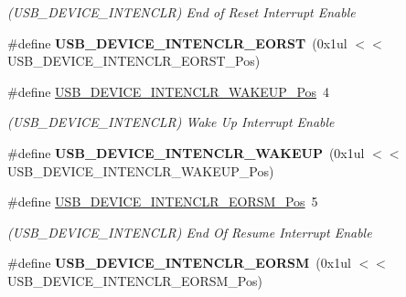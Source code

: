 \begin{DoxyCompactItemize}
\begin{DoxyCompactList}\small\item\em (U\+S\+B\+\_\+\+D\+E\+V\+I\+C\+E\+\_\+\+I\+N\+T\+E\+N\+C\+L\+R) End of Reset Interrupt Enable \end{DoxyCompactList}\item 
\hypertarget{group___s_a_m_l21___u_s_b_ga73304a6171c53a0b1095545a0daf5548}{}\#define {\bfseries U\+S\+B\+\_\+\+D\+E\+V\+I\+C\+E\+\_\+\+I\+N\+T\+E\+N\+C\+L\+R\+\_\+\+E\+O\+R\+S\+T}~(0x1ul $<$$<$ U\+S\+B\+\_\+\+D\+E\+V\+I\+C\+E\+\_\+\+I\+N\+T\+E\+N\+C\+L\+R\+\_\+\+E\+O\+R\+S\+T\+\_\+\+Pos)\label{group___s_a_m_l21___u_s_b_ga73304a6171c53a0b1095545a0daf5548}

\item 
\hypertarget{group___s_a_m_l21___u_s_b_gaa2138552cbf627a1ebeebf93d23dd98a}{}\#define \hyperlink{group___s_a_m_l21___u_s_b_gaa2138552cbf627a1ebeebf93d23dd98a}{U\+S\+B\+\_\+\+D\+E\+V\+I\+C\+E\+\_\+\+I\+N\+T\+E\+N\+C\+L\+R\+\_\+\+W\+A\+K\+E\+U\+P\+\_\+\+Pos}~4\label{group___s_a_m_l21___u_s_b_gaa2138552cbf627a1ebeebf93d23dd98a}

\begin{DoxyCompactList}\small\item\em (U\+S\+B\+\_\+\+D\+E\+V\+I\+C\+E\+\_\+\+I\+N\+T\+E\+N\+C\+L\+R) Wake Up Interrupt Enable \end{DoxyCompactList}\item 
\hypertarget{group___s_a_m_l21___u_s_b_gaa973618d4b8aa90c9ff4f711c09f52af}{}\#define {\bfseries U\+S\+B\+\_\+\+D\+E\+V\+I\+C\+E\+\_\+\+I\+N\+T\+E\+N\+C\+L\+R\+\_\+\+W\+A\+K\+E\+U\+P}~(0x1ul $<$$<$ U\+S\+B\+\_\+\+D\+E\+V\+I\+C\+E\+\_\+\+I\+N\+T\+E\+N\+C\+L\+R\+\_\+\+W\+A\+K\+E\+U\+P\+\_\+\+Pos)\label{group___s_a_m_l21___u_s_b_gaa973618d4b8aa90c9ff4f711c09f52af}

\item 
\hypertarget{group___s_a_m_l21___u_s_b_gac20c4c3b35e34f18f4c8967128235f77}{}\#define \hyperlink{group___s_a_m_l21___u_s_b_gac20c4c3b35e34f18f4c8967128235f77}{U\+S\+B\+\_\+\+D\+E\+V\+I\+C\+E\+\_\+\+I\+N\+T\+E\+N\+C\+L\+R\+\_\+\+E\+O\+R\+S\+M\+\_\+\+Pos}~5\label{group___s_a_m_l21___u_s_b_gac20c4c3b35e34f18f4c8967128235f77}

\begin{DoxyCompactList}\small\item\em (U\+S\+B\+\_\+\+D\+E\+V\+I\+C\+E\+\_\+\+I\+N\+T\+E\+N\+C\+L\+R) End Of Resume Interrupt Enable \end{DoxyCompactList}\item 
\hypertarget{group___s_a_m_l21___u_s_b_ga1fb6ef97ede25b2c4bce9efea375503f}{}\#define {\bfseries U\+S\+B\+\_\+\+D\+E\+V\+I\+C\+E\+\_\+\+I\+N\+T\+E\+N\+C\+L\+R\+\_\+\+E\+O\+R\+S\+M}~(0x1ul $<$$<$ U\+S\+B\+\_\+\+D\+E\+V\+I\+C\+E\+\_\+\+I\+N\+T\+E\+N\+C\+L\+R\+\_\+\+E\+O\+R\+S\+M\+\_\+\+Pos)\label{group___s_a_m_l21___u_s_b_ga1fb6ef97ede25b2c4bce9efea375503f}


\end{DoxyCompactItemize}
